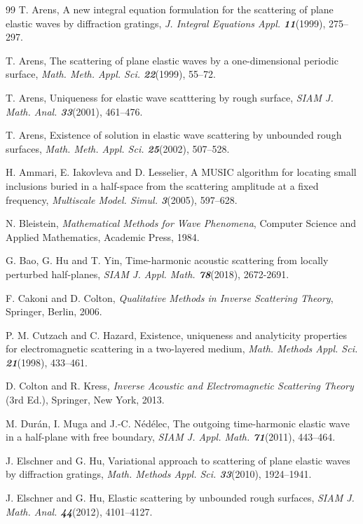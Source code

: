 \documentclass[final,reqno]{siamltex}
\begin{document}
\begin{thebibliography}{99}
 T. Arens, A new integral equation formulation for the scattering of plane elastic waves by diffraction gratings, {\em J. Integral Equations Appl. \bf11}(1999), 275--297. 
	
 T. Arens, The scattering of plane elastic waves by a one-dimensional periodic surface, {\em Math. Meth. Appl. Sci. \bf22}(1999), 55--72. 
	
 T. Arens, Uniqueness for elastic wave scatttering by rough surface, {\em SIAM J. Math. Anal. \bf33}(2001), 461--476.  

 T. Arens, Existence of solution in elastic wave scattering by unbounded rough surfaces, {\em Math. Meth. Appl. Sci. \bf25}(2002), 507--528. 

 H. Ammari, E. Iakovleva and D. Lesselier, A MUSIC algorithm for locating small inclusions buried in a half-space from the scattering amplitude at a fixed frequency, {\em Multiscale Model. Simul. \bf3}(2005), 597--628. 

 N. Bleistein, {\em Mathematical Methods for Wave Phenomena}, Computer Science and Applied Mathematics, Academic Press, 1984. 

 G. Bao, G. Hu and T. Yin, Time-harmonic acoustic scattering from locally perturbed half-planes, {\em SIAM J. Appl. Math. \bf78}(2018), 2672-2691. 

 F. Cakoni and D. Colton, {\em Qualitative Methods in Inverse Scattering Theory}, Springer, Berlin, 2006.

 P. M. Cutzach and C. Hazard, Existence, uniqueness and analyticity properties for electromagnetic scattering in a two-layered medium, {\em Math. Methods Appl. Sci. \bf21}(1998), 433--461. 

 D. Colton and R. Kress, {\em Inverse Acoustic and Electromagnetic Scattering Theory} (3rd Ed.), Springer, New York, 2013.

 M. Dur\'{a}n, I. Muga and J.-C. N\'{e}d\'{e}lec, The outgoing time-harmonic elastic wave in a half-plane with free boundary, {\em SIAM J. Appl. Math. \bf71}(2011), 443--464. 

 J. Elschner and G. Hu, Variational approach to scattering of plane elastic waves by diffraction gratings, {\em Math. Methods Appl. Sci. \bf33}(2010), 1924--1941. 

 J. Elschner and G. Hu, Elastic scattering by unbounded rough surfaces, {\em SIAM J. Math. Anal. \bf44}(2012), 4101--4127. 


\end{thebibliography}
\end{document}
